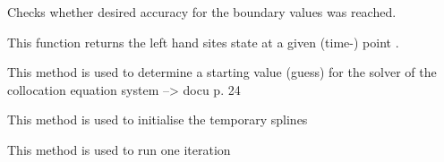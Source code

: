 \documentclass[letterpaper,10pt,english]{sphinxmanual}
\begin{document}
\begin{fulllineitems}

\begin{fulllineitems}
\label{pytrajectory:pytrajectory.trajectory.Trajectory.checkAccuracy}
Checks whether desired accuracy for the boundary values was reached.

\end{fulllineitems}


\begin{fulllineitems}
\label{pytrajectory:pytrajectory.trajectory.Trajectory.dx}
This function returns the left hand sites state at a given (time-) point .

\end{fulllineitems}


\begin{fulllineitems}
\label{pytrajectory:pytrajectory.trajectory.Trajectory.getGuess}
This method is used to determine a starting value (guess) for the
solver of the collocation equation system --\textgreater{} docu p. 24

\end{fulllineitems}


\begin{fulllineitems}
\label{pytrajectory:pytrajectory.trajectory.Trajectory.initSplines}
This method is used to initialise the temporary splines

\end{fulllineitems}


\begin{fulllineitems}
\label{pytrajectory:pytrajectory.trajectory.Trajectory.iterate}
This method is used to run one iteration

\end{fulllineitems}



\end{fulllineitems}
\end{document}
